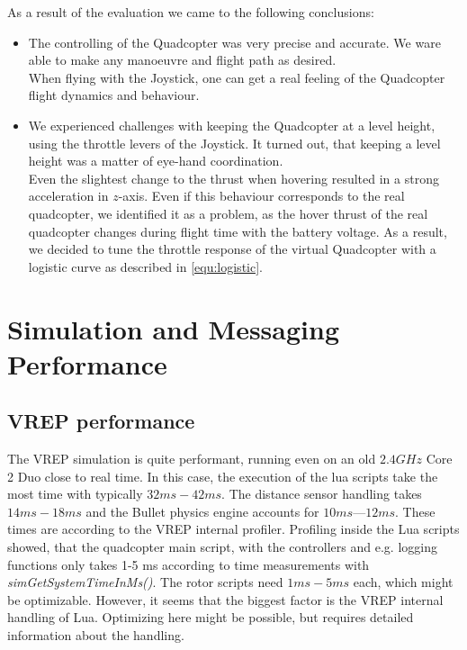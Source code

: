 As a result of the evaluation we came to the following conclusions:

\begin{itemize}
\item{The controlling of the Quadcopter was very precise and accurate. 
We ware able to make any manoeuvre and flight path as desired. \\ 

When flying with the Joystick, one can get a real feeling of the Quadcopter flight dynamics and behaviour}.

\item{We experienced challenges with keeping the Quadcopter at a level height, using the throttle levers of the Joystick. 
It turned out, that keeping a level height was a matter of eye-hand coordination. \\

Even the slightest change to the thrust when hovering resulted in a strong acceleration in $z$-axis. 
Even if this behaviour corresponds to the real quadcopter, we identified it as a problem, as the hover thrust of the real quadcopter changes during flight time with the battery voltage. 
As a result, we decided to tune the throttle response of the virtual Quadcopter with a logistic curve as described in \ref{equ:logistic}}.

\end{itemize}

\section{Simulation and Messaging  Performance}
\label{sec:performance}
\subsection{VREP performance}
 The VREP simulation is quite performant, running even on an old $2.4 GHz$ Core 2 Duo close to real time.
 In this case, the execution of the lua scripts take the most time with typically $32ms - 42ms$.
 The distance sensor handling takes $14ms - 18ms$ and the Bullet physics engine accounts for $10ms — 12ms$.
 These times are according to the VREP internal profiler.
 Profiling inside the Lua scripts showed, that the quadcopter main script, with the controllers and e.g. logging functions only takes 1-5 ms according to time measurements with  \emph{simGetSystemTimeInMs()}.
 The rotor scripts need $1ms - 5ms$ each, which might be optimizable.
 However, it seems that the biggest factor is the VREP internal handling of Lua.
 Optimizing here might be possible, but requires detailed information about the handling.
 
